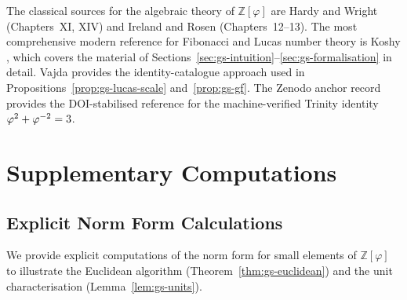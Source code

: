 The classical sources for the algebraic theory of \(\mathbb{Z}[\varphi]\)
are Hardy and Wright \cite{hardy_wright} (Chapters~XI, XIV) and
Ireland and Rosen \cite{ireland_rosen} (Chapters~12–13).  The most
comprehensive modern reference for Fibonacci and Lucas number theory
is Koshy \cite{koshy_fib_lucas}, which covers the material of
Sections~\ref{sec:gs-intuition}–\ref{sec:gs-formalisation} in detail.
Vajda \cite{vajda_fib_lucas} provides the identity-catalogue
approach used in Propositions~\ref{prop:gs-lucas-scale}
and~\ref{prop:gs-gf}.  The Zenodo anchor record
\cite{zenodo_trinity_anchor} provides the DOI-stabilised reference
for the machine-verified Trinity identity \(\varphi^{2}+\varphi^{-2}=3\).


\section{Supplementary Computations}
\label{sec:gs-supplementary}

\subsection{Explicit Norm Form Calculations}
\label{subsec:gs-normcalc}

We provide explicit computations of the norm form for small elements
of \(\mathbb{Z}[\varphi]\) to illustrate the Euclidean algorithm
(Theorem~\ref{thm:gs-euclidean}) and the unit characterisation
(Lemma~\ref{lem:gs-units}).

